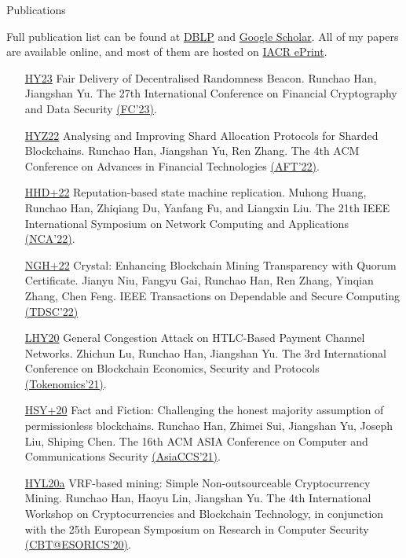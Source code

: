 \documentclass{resume} %
\begin{document}
\begin{rSection}{Publications}

    Full publication list can be found at \href{https://dblp.org/pers/hd/h/Han:Runchao}{DBLP} and \href{http://scholar.google.com/citations?user=xbpDocQAAAAJ&hl=en}{Google Scholar}.
    All of my papers are available online, and most of them are hosted on \href{https://eprint.iacr.org/}{IACR ePrint}.

    \begin{itemize}
        \item[\href{}{HY23}] Fair Delivery of Decentralised Randomness Beacon. Runchao Han, Jiangshan Yu. The 27th International Conference on Financial Cryptography and Data Security \href{https://fc23.ifca.ai/}{(FC'23)}.
        \item[\href{https://eprint.iacr.org/2020/943}{HYZ22}] Analysing and Improving Shard Allocation Protocols for Sharded Blockchains. Runchao Han, Jiangshan Yu, Ren Zhang. The 4th ACM Conference on Advances in Financial Technologies \href{https://aft.acm.org/aft22/index.html}{(AFT'22)}.
        \item[\href{}{HHD+22}] Reputation-based state machine replication. Muhong Huang, Runchao Han, Zhiqiang Du, Yanfang Fu, and Liangxin Liu. The 21th IEEE International Symposium on Network Computing and Applications \href{https://www.nca-ieee.org/2022/index.html}{(NCA'22)}.
        \item[\href{https://ieeexplore.ieee.org/document/9927474/}{NGH+22}] Crystal: Enhancing Blockchain Mining Transparency with Quorum Certificate. Jianyu Niu, Fangyu Gai, Runchao Han, Ren Zhang, Yinqian Zhang, Chen Feng. IEEE Transactions on Dependable and Secure Computing \href{https://ieeexplore.ieee.org/xpl/RecentIssue.jsp?punumber=8858}{(TDSC'22)}
        \item[\href{https://eprint.iacr.org/2020/456.pdf}{LHY20}] General Congestion Attack on HTLC-Based Payment Channel Networks. Zhichun Lu, Runchao Han, Jiangshan Yu. The 3rd International Conference on Blockchain Economics, Security and Protocols \href{https://drops.dagstuhl.de/opus/volltexte/2022/15899/}{(Tokenomics'21)}.
        \item[\href{https://eprint.iacr.org/2019/752}{HSY+20}] Fact and Fiction: Challenging the honest majority assumption of permissionless blockchains. Runchao Han, Zhimei Sui, Jiangshan Yu, Joseph Liu, Shiping Chen. The 16th ACM ASIA Conference on Computer and Communications Security \href{https://dl.acm.org/doi/10.1145/3433210.3453087}{(AsiaCCS'21)}.
        \item[\href{https://github.com/DEX-ware/vrf-mining/blob/master/paper/main.pdf}{HYL20a}] VRF-based mining: Simple Non-outsourceable Cryptocurrency Mining. Runchao Han, Haoyu Lin, Jiangshan Yu. The 4th International Workshop on Cryptocurrencies and Blockchain Technology, in conjunction with the 25th European Symposium on Research in Computer Security \href{https://link.springer.com/chapter/10.1007/978-3-030-66172-4_19}{(CBT@ESORICS'20)}.

\end{itemize}
\end{rSection}
\end{document}

